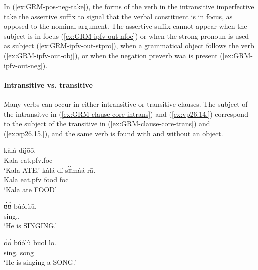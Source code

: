 \begin{exe}
\begin{exe}
\begin{exe}
{\begin{exe}
\begin{exe}
\begin{exe}
\begin{exe}
\begin{exe}
\begin{exe}
\begin{exe}
\begin{exe}
\begin{exe}
\begin{exe}
\begin{exe}
\begin{exe}
\begin{exe}
\begin{exe}
\begin{exe}
\begin{exe}
\begin{exe}
\begin{exe}
\begin{exe}
\z 
 \z

In (\ref{ex:GRM-pos-neg-take}), the forms of the verb in the
intransitive imperfective take the assertive suffix to signal that the verbal
constituent is in focus, as opposed to the nominal argument. The 
assertive suffix cannot appear
when the subject is in focus (\ref{ex:GRM-ipfv-out-nfoc}) or when the strong
pronoun is used as subject (\ref{ex:GRM-ipfv-out-stpro}), when a grammatical
object follows the verb  (\ref{ex:GRM-ipfv-out-obj}), or when the negation
preverb {\sls waa} is present  (\ref{ex:GRM-ipfv-out-neg}).



\paragraph{Intransitive vs. transitive}
\label{sec:GRM-trans-intran}


Many verbs can occur in either  intransitive or transitive clauses. The subject 
of the intransitve  in (\ref{ex:GRM-clause-core-intrans}) and 
(\ref{ex:vp26.14.}) correspond to the subject of the transitive  in  
(\ref{ex:GRM-clause-core-trans}) and (\ref{ex:vp26.15.}), and the same verb is 
found with and without an object.


\begin{multicols}{2}
\ea\label{ex:GRM-clause-core}


 \ea\label{ex:GRM-clause-core-intrans}
\gll kàlá díjōō.\\
 Kala eat.{\sc pfv.foc}\\
\glt  `Kala ATE.' 
\ex\label{ex:GRM-clause-core-trans}
\gll kàlá dí sɪ̀ɪ̀máá rā.\\
Kala eat.{\sc pfv}  food {\sc foc}\\
\glt  `Kala ate FOOD' 



\ex\label{ex:vp26.14.}
\gll ʊ̀ʊ̀ búólùū.\\
    {\psg} sing.{\ipfv.\foc}\\
\glt  `He is SINGING.' 

\ex\label{ex:vp26.15.}
\gll  ʊ̀ʊ̀ búólù būōl lō.\\
    {\psg}  sing.{\ipfv} song {\foc}\\
\glt  `He is singing a SONG.' 

\z
 \z
 \end{multicols}



\end{exe}
\end{exe}
\end{exe}
\end{exe}
\end{exe}
\end{exe}
\end{exe}
\end{exe}
\end{exe}
\end{exe}
\end{exe}
\end{exe}
\end{exe}
\end{exe}
\end{exe}
\end{exe}
\end{exe}
\end{exe}
\end{exe}}
\end{exe}
\end{exe}
\end{exe}
